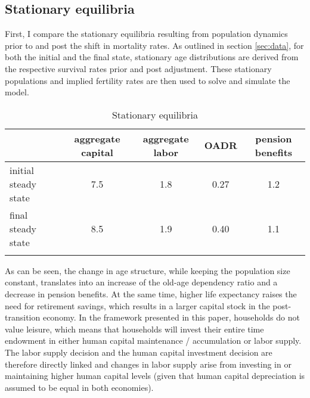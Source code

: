 \subsection{Stationary equilibria}

First, I compare the stationary equilibria resulting from population dynamics prior to and post the shift in mortality rates. As outlined in section \ref{sec:data}, for both the initial and the final state, stationary age distributions are derived from the respective survival rates prior and post adjustment. These stationary populations and implied fertility rates are then used to solve and simulate the model.

\begin{table}[ht]
    \caption{Stationary equilibria}
    \label{tab:stationary_aggregates}
    \centering
    \begin{tabular}{l c c c c}
        \hline \hline
                                &aggregate capital  & aggregate labor   & OADR  & pension benefits \\
        \hline
        initial steady state    &7.5                &1.8                &0.27   &1.2  \\
        final steady state      &8.5                &1.9                &0.40   &1.1  \\
        \hline \hline \\
    \end{tabular}
\end{table}

As can be seen, the change in age structure, while keeping the population size constant, translates into an increase of the old-age dependency ratio and a decrease in pension benefits. At the same time, higher life expectancy raises the need for retirement savings, which results in a larger capital stock in the post-transition economy. In the framework presented in this paper, households do not value leisure, which means that households will invest their entire time endowment in either human capital maintenance / accumulation or labor supply. The labor supply decision and the human capital investment decision are therefore directly linked and changes in labor supply arise from investing in or maintaining higher human capital levels (given that human capital depreciation is assumed to be equal in both economies).